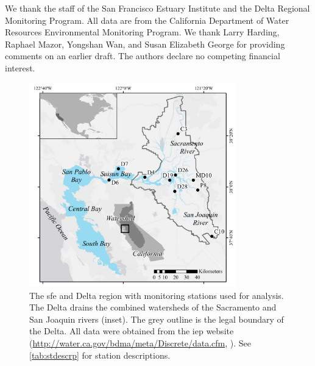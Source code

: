 \documentclass[letterpaper,12pt,oneside]{article}\usepackage[]{graphicx}\usepackage[]{color}
\begin{document}
We thank the staff of the San Francisco Estuary Institute and the Delta Regional Monitoring Program.  All data are from the California Department of Water Resources Environmental Monitoring Program. We thank Larry Harding, Raphael Mazor, Yongshan Wan, and Susan Elizabeth George for providing comments on an earlier draft. The authors declare no competing financial interest.

\begin{singlespace}


\end{singlespace}
\clearpage


\begin{figure}
\centering
\includegraphics[width=0.8\textwidth,page=1]{figs/delt_map.pdf}
\caption{The \acl{sfe} and Delta region with monitoring stations used for analysis. The Delta drains the combined watersheds of the Sacramento and San Joaquin rivers (inset). The grey outline is the legal boundary of the Delta. All data were obtained from the \acl{iep} website (\url{http://water.ca.gov/bdma/meta/Discrete/data.cfm}, \cite{IEP13}). See \cref{tab:stdescrp} for station descriptions.}
\label{fig:delt_map}   
\end{figure}
\end{document}

